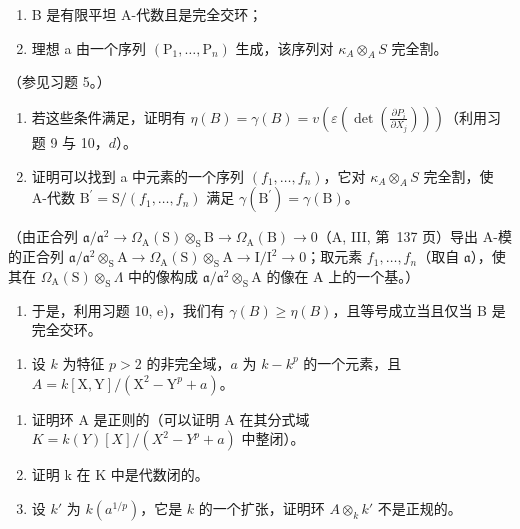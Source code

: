 \begin{enumerate}
\def\labelenumi{(\roman{enumi})}
\item
  B 是有限平坦 A-代数且是完全交环；
\item
  理想 a 由一个序列 \((\mathrm{P}_{1},\ldots,\mathrm{P}_{n})\) 生成，该序列对 \(\kappa_{A}\otimes_{A}S\) 完全割。
\end{enumerate}

（参见习题 5。）

\begin{enumerate}
\def\labelenumi{\alph{enumi})}
\setcounter{enumi}{2}
\item
  若这些条件满足，证明有 \(\eta(B) = \gamma(B) = v(\varepsilon(\det(\frac{\partial P_i}{\partial X_j})))\)（利用习题 9 与 10，\(d\)）。
\item
  证明可以找到 a 中元素的一个序列 \((f_{1},\ldots,f_{n})\)，它对 \(\kappa_{A}\otimes_{A}S\) 完全割，使 A-代数 \(\mathrm{B}^{\prime}=\mathrm{S}/(f_{1},\ldots,f_{n})\) 满足 \(\gamma(\mathrm{B}^{\prime})=\gamma(\mathrm{B})\)。
\end{enumerate}

（由正合列 \(\mathfrak{a}/\mathfrak{a}^{2}\to\Omega_{\mathrm{A}}(\mathrm{S})\otimes_{\mathrm{S}}\mathrm{B}\to\Omega_{\mathrm{A}}(\mathrm{B})\to0\)（A, III, 第~137 页）导出 A-模的正合列 \(\mathfrak{a}/\mathfrak{a}^{2}\otimes_{\mathrm{S}}\mathrm{A}\to\Omega_{\mathrm{A}}(\mathrm{S})\otimes_{\mathrm{S}}\mathrm{A}\to\mathrm{I}/\mathrm{I}^{2}\to0\)；取元素 \(f_{1},\ldots,f_{n}\)（取自 \(\mathfrak{a}\)），使其在 \(\Omega_{\mathrm{A}}(\mathrm{S})\otimes_{\mathrm{S}}\Lambda\) 中的像构成 \(\mathfrak{a}/\mathfrak{a}^{2}\otimes_{\mathrm{S}}\mathrm{A}\) 的像在 A 上的一个基。）

\begin{enumerate}
\def\labelenumi{\alph{enumi})}
\setcounter{enumi}{4}
\tightlist
\item
  于是，利用习题 10, e)，我们有 \(\gamma(B) \geqslant \eta(B)\)，且等号成立当且仅当 B 是完全交环。
\end{enumerate}


\begin{enumerate}
\def\labelenumi{\arabic{enumi})}
\tightlist
\item
  设 \(k\) 为特征 \(p > 2\) 的非完全域，\(a\) 为 \(k - k^p\) 的一个元素，且 \(A = k[\mathrm{X},\mathrm{Y}] / (\mathrm{X}^2 -\mathrm{Y}^p +a)\)。
\end{enumerate}

\begin{enumerate}
\def\labelenumi{\alph{enumi})}
\item
  证明环 A 是正则的（可以证明 A 在其分式域 \(K = k(Y)[X]/(X^{2} - Y^{p} + a)\) 中整闭）。
\item
  证明 k 在 K 中是代数闭的。
\item
  设 \(k'\) 为 \(k(a^{1/p})\)，它是 \(k\) 的一个扩张，证明环 \(A \otimes_k k'\) 不是正规的。
\end{enumerate}

